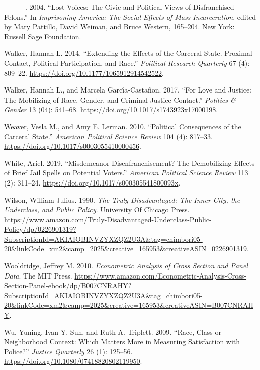 \documentclass[]{article}
\begin{document}
\leavevmode\hypertarget{ref-Uggen2004}{}%
---------. 2004. ``Lost Voices: The Civic and Political Views of Disfranchised Felons.'' In \emph{Imprisoning America: The Social Effects of Mass Incarceration}, edited by Mary Pattillo, David Weiman, and Bruce Western, 165--204. New York: Russell Sage Foundation.

\leavevmode\hypertarget{ref-Walker2014}{}%
Walker, Hannah L. 2014. ``Extending the Effects of the Carceral State. Proximal Contact, Political Participation, and Race.'' \emph{Political Research Quarterly} 67 (4): 809--22. \url{https://doi.org/10.1177/1065912914542522}.

\leavevmode\hypertarget{ref-Walker2017}{}%
Walker, Hannah L., and Marcela Garcı́a-Castañon. 2017. ``For Love and Justice: The Mobilizing of Race, Gender, and Criminal Justice Contact.'' \emph{Politics \& Gender} 13 (04): 541--68. \url{https://doi.org/10.1017/s1743923x17000198}.

\leavevmode\hypertarget{ref-Weaver2010}{}%
Weaver, Vesla M., and Amy E. Lerman. 2010. ``Political Consequences of the Carceral State.'' \emph{American Political Science Review} 104 (4): 817--33. \url{https://doi.org/10.1017/s0003055410000456}.

\leavevmode\hypertarget{ref-White2019}{}%
White, Ariel. 2019. ``Misdemeanor Disenfranchisement? The Demobilizing Effects of Brief Jail Spells on Potential Voters.'' \emph{American Political Science Review} 113 (2): 311--24. \url{https://doi.org/10.1017/s000305541800093x}.

\leavevmode\hypertarget{ref-Wilson1990}{}%
Wilson, William Julius. 1990. \emph{The Truly Disadvantaged: The Inner City, the Underclass, and Public Policy}. University Of Chicago Press. \url{https://www.amazon.com/Truly-Disadvantaged-Underclass-Public-Policy/dp/0226901319?SubscriptionId=AKIAIOBINVZYXZQZ2U3A\&tag=chimbori05-20\&linkCode=xm2\&camp=2025\&creative=165953\&creativeASIN=0226901319}.

\leavevmode\hypertarget{ref-Wooldridge2010}{}%
Wooldridge, Jeffrey M. 2010. \emph{Econometric Analysis of Cross Section and Panel Data}. The MIT Press. \url{https://www.amazon.com/Econometric-Analysis-Cross-Section-Panel-ebook/dp/B007CNRAHY?SubscriptionId=AKIAIOBINVZYXZQZ2U3A\&tag=chimbori05-20\&linkCode=xm2\&camp=2025\&creative=165953\&creativeASIN=B007CNRAHY}.

\leavevmode\hypertarget{ref-Wu2009}{}%
Wu, Yuning, Ivan Y. Sun, and Ruth A. Triplett. 2009. ``Race, Class or Neighborhood Context: Which Matters More in Measuring Satisfaction with Police?'' \emph{Justice Quarterly} 26 (1): 125--56. \url{https://doi.org/10.1080/07418820802119950}.
\end{document}
